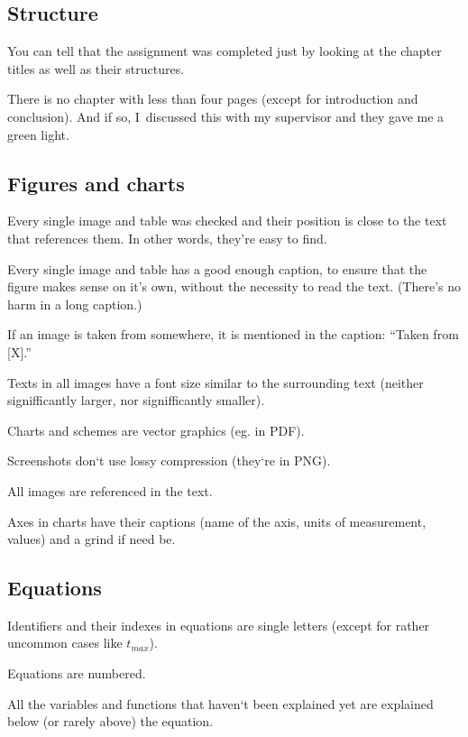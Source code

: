 \subsection*{Structure}
\begin{checklist}
	\item You can tell that the assignment was completed just by looking at the chapter titles as well as their structures.
    \item There is no chapter with less than four pages (except for introduction and conclusion). And if so, I~discussed this with my supervisor and they gave me a green light.
\end{checklist}

\subsection*{Figures and charts}
\begin{checklist}
	\item Every single image and table was checked and their position is close to the text that references them. In other words, they’re easy to find.
    \item Every single image and table has a good enough caption, to ensure that the figure makes sense on it’s own, without the necessity to read the text. (There’s no harm in a long caption.)
    \item If an image is taken from somewhere, it is mentioned in the caption: “Taken from [X].”
    \item Texts in all images have a font size similar to the surrounding text (neither signifficantly larger, nor signifficantly smaller).
    \item Charts and schemes are vector graphics (eg. in PDF).
    \item Screenshots don‘t use lossy compression (they‘re in PNG).
    \item All images are referenced in the text.
    \item Axes in charts have their captions (name of the axis, units of measurement, values) and a grind if need be.
\end{checklist}

\subsection*{Equations}
\begin{checklist}
	\item Identifiers and their indexes in equations are single letters (except for rather uncommon cases like $t_{max}$).
    \item Equations are numbered.
    \item All the variables and functions that haven‘t been explained yet are explained below (or rarely above) the equation.
\end{checklist}

